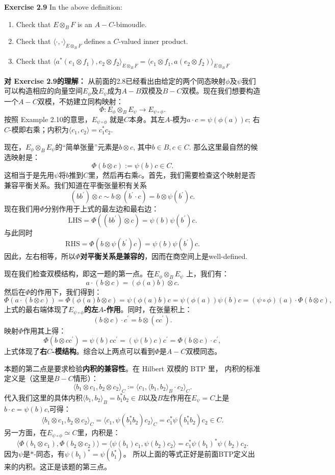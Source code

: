 \textbf{Exercise 2.9} In the above definition:
\begin{enumerate}
    \item Check that $E\otimes_BF$ is an $A-C$-bimoudle.
    \item Check that $\langle\cdot,\cdot\rangle_{E\otimes_BF}$ defines a $C$-valued inner product.
    \item Check that $\langle a^*(e_1\otimes f_1),e_2\otimes f_2\rangle_{E\otimes_BF}=\langle e_1\otimes f_1,a(e_2\otimes f_2)\rangle_{E\otimes_BF}$
\end{enumerate}

\textbf{对 Exercise 2.9的理解：} 从前面的2.8已经看出由给定的两个同态映射$\phi$及$\psi$我们可以构造相应的向量空间$E_{\phi}$及$E_{\psi}$成为$A-B$双模及$B-C$双模。现在我们想要构造一个$A-C$双模，不妨建立同构映射：\[\Phi:E_{\phi}\otimes_BE_{\psi}\rightarrow E_{\psi\circ\phi}.\] 按照 Example 2.10的意思，$E_{\psi\circ\phi}$ 就是$C$本身。其左$A$-模为$a\cdot c=\psi(\phi(a))c$; 右$C$-模即右乘；内积为$\langle c_1, c_2\rangle=c_1^*c_2$.

现在，$E_{\phi}\otimes_BE_{\psi}$的“简单张量”元素是$b\otimes c$, 其中$b\in B, c\in C$. 那么这里最自然的候选映射是：\[\Phi(b\otimes c):=\psi(b)c\in C.\]这相当于是先用$\psi$将$b$推到$C$里，然后再右乘$c$。首先，我们需要检查这个映射是否兼容平衡关系。我们知道在平衡张量积有关系\[(bb^{\prime})\otimes c\sim b\otimes (b^{\prime}\cdot c)=b\otimes \psi(b^{\prime})c.\]现在我们用$\Phi$分别作用于上式的最左边和最右边：\[\text{LHS}=\Phi((bb^{\prime})\otimes c)=\psi(b)\psi(b^{\prime})c.\]与此同时\[\text{RHS}=\Phi(b\otimes\psi(b^{\prime})c)=\psi(b)\psi(b^{\prime})c.\]因此，左右相等，所以\textbf{$\Phi$对平衡关系是兼容的}，因而在商空间上是well-defined.

现在我们检查双模结构，即这一题的第一点。在$E_{\phi}\otimes_B E_{\psi}$ 上，我们有：\[a\cdot(b\otimes c)=(\phi(a)b)\otimes c.\]然后在$\Phi$的作用下，我们得到：\[\Phi(a\cdot(b\otimes c))=\Phi(\phi(a)b\otimes c)=\psi(\phi(a)b)c=\psi(\phi(a))\psi(b)c=(\psi\circ\phi)(a)\cdot\Phi(b\otimes c),\]上式的最右端体现了\textbf{$E_{\psi\circ\phi}$的左$A$-作用}。同时，在张量积上：\[(b\otimes c)\cdot c^{\prime}=b\otimes(cc^{\prime}).\]映射$\Phi$作用其上得：\[\Phi(b\otimes cc^{\prime})=\psi(b)cc^{\prime}=(\psi(b)c)c^{\prime}=\Phi(b\otimes c)\cdot c^{\prime},\]上式体现了\textbf{右$C$-模结构}。综合以上两点可以看到$\Phi$是$A-C$双模同态。

本题的第二点是要求检验\textbf{内积的兼容性}。在 Hilbert 双模的 BTP 里， 内积的标准定义是（这里是$B-C$情形）：
\[\langle b_1\otimes c_1, b_2\otimes c_2\rangle_C\coloneqq\langle c_1,\langle b_1,b_2\rangle_B\cdot c_2\rangle_C.\]
代入我们这里的具体内积$\langle b_1,b_2\rangle_B=b^*_1b_2\in B$以及$B$左作用在$E_{\psi}=C$上是$b\cdot c=\psi(b)c$,可得：
\[\langle b_1\otimes c_1, b_2\otimes c_2\rangle_C=\langle c_1, \psi(b^*_1b_2)c_2\rangle_C=c^*_1\psi(b_1^*b_2)c_2\in C.\]
另一方面，在$E_{\psi\circ\phi}\simeq C$里，内积是：
\[\langle \Phi(b_1\otimes c_1),\Phi(b_2\otimes c_2)\rangle=\langle\psi(b_1)c_1,\psi(b_2)c_2\rangle=c^*_1\psi(b_1)^*\psi(b_2)c_2.\]
因为$\psi$是$*$-同态，有$\psi(b_1)^*=\psi(b_1^*)$。 所以上面的等式正好是前面BTP定义出来的内积。这正是该题的第三点。

